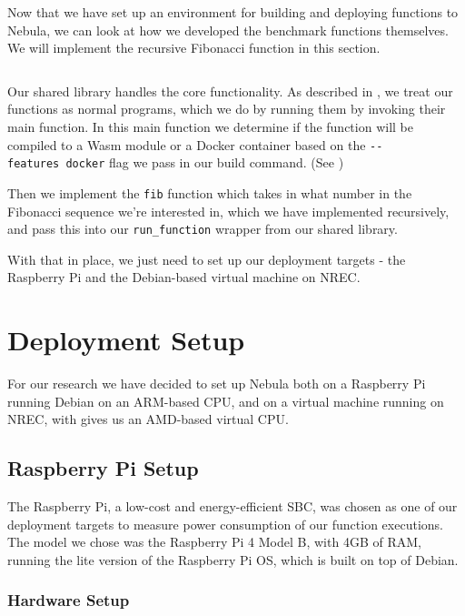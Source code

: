 \documentclass[
  table]{report}
\begin{document}
Now that we have set up an environment for building and deploying
functions to Nebula, we can look at how we developed the benchmark
functions themselves. We will implement the recursive Fibonacci function
in this section.

\inputminted{rust}{assets/code/fib-recursive.rs}

Our shared library handles the core functionality. As described in
, we treat our functions as normal
programs, which we do by running them by invoking their main function.
In this main function we determine if the function will be compiled to a
\ac{Wasm} module or a Docker container based on the
\texttt{-\/-features\ docker} flag we pass in our build command. (See
)

Then we implement the \texttt{fib} function which takes in what number
in the Fibonacci sequence we're interested in, which we have implemented
recursively, and pass this into our \texttt{run\_function} wrapper from
our shared library.

With that in place, we just need to set up our deployment targets - the
Raspberry Pi and the Debian-based virtual machine on \ac{NREC}.

\section{Deployment Setup}

For our research we have decided to set up Nebula both on a Raspberry Pi
running Debian on an ARM-based CPU, and on a virtual machine running on
\ac{NREC}, with gives us an AMD-based virtual CPU.

\subsection{Raspberry Pi Setup}

The Raspberry Pi, a low-cost and energy-efficient \ac{SBC}, was chosen
as one of our deployment targets to measure power consumption of our
function executions. The model we chose was the Raspberry Pi 4 Model B,
with 4GB of RAM, running the lite version of the Raspberry Pi OS, which
is built on top of Debian.

\subsubsection{Hardware Setup}
\end{document}
